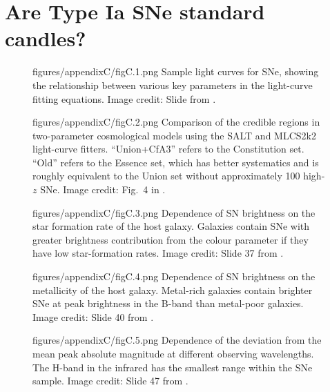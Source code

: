 \chapter{Are Type Ia SNe standard candles?}
\label{app:type-ia-standard-candles}




\begin{figure}
    \centering
\staticfigure
    {figures/appendixC/figC.1.png}
    {Sample light curves for SNe, showing the relationship between various key parameters in the light-curve fitting equations. Image credit: Slide from \cite{Lidman2010b}.}
\end{figure}

\begin{figure}
\staticfigure
    {figures/appendixC/figC.2.png}
    {Comparison of the credible regions in two-parameter cosmological models using the SALT and MLCS2k2 light-curve fitters. ``Union+CfA3'' refers to the Constitution set. ``Old'' refers to the Essence set, which has better systematics and is roughly equivalent to the Union set without approximately 100 high-$z$ SNe. Image credit: Fig.~4 in \cite{Hicken2009}.}
\end{figure}

\begin{figure}
\staticfigure
    {figures/appendixC/figC.3.png}
    {Dependence of SN brightness on the star formation rate of the host galaxy. Galaxies contain SNe with greater brightness contribution from the colour parameter if they have low star-formation rates. Image credit: Slide 37 from \cite{Lidman2010b}.}
\end{figure}

\begin{figure}
\staticfigure
    {figures/appendixC/figC.4.png}
    {Dependence of SN brightness on the metallicity of the host galaxy. Metal-rich galaxies contain brighter SNe at peak brightness in the B-band than metal-poor galaxies. Image credit: Slide 40 from \cite{Lidman2010b}.}
\end{figure}

\begin{figure}
\staticfigure
    {figures/appendixC/figC.5.png}
    {Dependence of the deviation from the mean peak absolute magnitude at different observing wavelengths. The H-band in the infrared has the smallest range within the SNe sample. Image credit: Slide 47 from \cite{Lidman2010b}.}
\end{figure}

